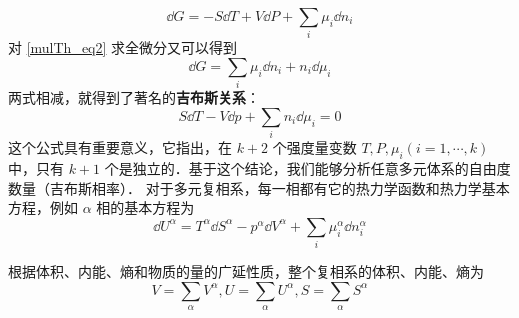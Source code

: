 \begin{equation}
\dd G=-S\dd T+V\dd P+\sum_i\mu_i\dd n_i
\end{equation}
对 \autoref{mulTh_eq2} 求全微分又可以得到
\begin{equation}
\dd G=\sum_i\mu_i\dd n_i+n_i\dd \mu_i
\end{equation}
两式相减，就得到了著名的\textbf{吉布斯关系}：
\begin{equation}
S\dd T-V\dd p+\sum_i n_i\dd \mu_i=0
\end{equation}
这个公式具有重要意义，它指出，在 $k+2$ 个强度量变数 $T,P,\mu_i(i=1,\cdots,k)$ 中，只有 $k+1$ 个是独立的．基于这个结论，我们能够分析任意多元体系的自由度数量（吉布斯相率）．
对于多元复相系，每一相都有它的热力学函数和热力学基本方程，例如 $\alpha$ 相的基本方程为
\begin{equation}
\dd U^\alpha=T^\alpha\dd S^\alpha-p^\alpha\dd V^\alpha+\sum_i\mu_i^\alpha\dd n_i^\alpha
\end{equation}

根据体积、内能、熵和物质的量的广延性质，整个复相系的体积、内能、熵为
\begin{equation}
V=\sum_\alpha V^\alpha,U=\sum_\alpha U^\alpha,S=\sum_\alpha S^\alpha
\end{equation}

